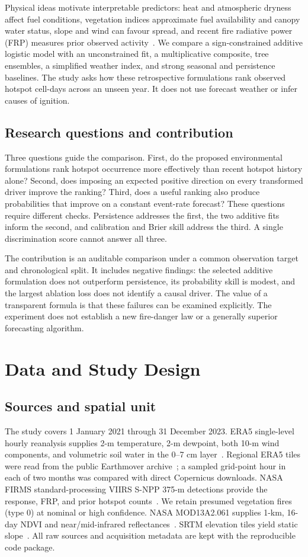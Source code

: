 \documentclass[conference]{IEEEtran}
\begin{document}
Physical ideas motivate interpretable predictors: heat and atmospheric dryness affect fuel conditions, vegetation indices approximate fuel availability and canopy water status, slope and wind can favour spread, and recent fire radiative power (FRP) measures prior observed activity~\cite{jones,wooster}. We compare a sign-constrained additive logistic model with an unconstrained fit, a multiplicative composite, tree ensembles, a simplified weather index, and strong seasonal and persistence baselines. The study asks how these retrospective formulations rank observed hotspot cell-days across an unseen year. It does not use forecast weather or infer causes of ignition.

\subsection{Research questions and contribution}
Three questions guide the comparison. First, do the proposed environmental formulations rank hotspot occurrence more effectively than recent hotspot history alone? Second, does imposing an expected positive direction on every transformed driver improve the ranking? Third, does a useful ranking also produce probabilities that improve on a constant event-rate forecast? These questions require different checks. Persistence addresses the first, the two additive fits inform the second, and calibration and Brier skill address the third. A single discrimination score cannot answer all three.

The contribution is an auditable comparison under a common observation target and chronological split. It includes negative findings: the selected additive formulation does not outperform persistence, its probability skill is modest, and the largest ablation loss does not identify a causal driver. The value of a transparent formula is that these failures can be examined explicitly. The experiment does not establish a new fire-danger law or a generally superior forecasting algorithm.

\section{Data and Study Design}
\subsection{Sources and spatial unit}
The study covers 1 January 2021 through 31 December 2023. ERA5 single-level hourly reanalysis supplies 2-m temperature, 2-m dewpoint, both 10-m wind components, and volumetric soil water in the 0--7 cm layer~\cite{era5}. Regional ERA5 tiles were read from the public Earthmover archive~\cite{earthmover}; a sampled grid-point hour in each of two months was compared with direct Copernicus downloads. NASA FIRMS standard-processing VIIRS S-NPP 375-m detections provide the response, FRP, and prior hotspot counts~\cite{firms,schroeder}. We retain presumed vegetation fires (type 0) at nominal or high confidence. NASA MOD13A2.061 supplies 1-km, 16-day NDVI and near/mid-infrared reflectances~\cite{modis}. SRTM elevation tiles yield static slope~\cite{srtm}. All raw sources and acquisition metadata are kept with the reproducible code package.
\end{document}
